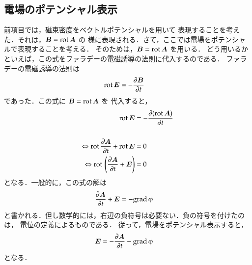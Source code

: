         \subsection{電場のポテンシャル表示}
            前項目では，磁束密度をベクトルポテンシャルを用いて
            表現することを考えた．それは，$\boldsymbol{B}=\mathrm{rot\,}\boldsymbol{A}$ の
            様に表現される．さて，ここでは電場をポテンシャルで表現することを考える．
            そのためは，$\boldsymbol{B}=\mathrm{rot\,}\boldsymbol{A}$ を用いる．
            どう用いるかといえば，この式をファラデーの電磁誘導の法則に代入するのである．
            ファラデーの電磁誘導の法則は
            \begin{align}
            \mathrm{rot}\, \boldsymbol{E} &= -\frac{\partial \boldsymbol{B}}{\partial t}
            \end{align}
            であった．この式に $\boldsymbol{B}=\mathrm{rot\,}\boldsymbol{A}$ を
            代入すると，
            \begin{align}
            \mathrm{rot\,} \boldsymbol{E} &= -\frac{\partial(\mathrm{rot\,}\boldsymbol{A})}{\partial t}\notag \\ \notag \\
            \Leftrightarrow
            \mathrm{rot\,}\frac{\partial\boldsymbol{A}}{\partial t}
            +\mathrm{rot\,} \boldsymbol{E}&=0 \notag \\
            \Leftrightarrow
            \mathrm{rot\,}\left(\frac{\partial\boldsymbol{A}}{\partial t}
            + \boldsymbol{E}\right) &=0
            \end{align}
            となる．一般的に，この式の解は
            \begin{align}
            \frac{\partial\boldsymbol{A}}{\partial t}
            + \boldsymbol{E}&=-\mathrm{grad\,}\phi
            \end{align}
            と書かれる．但し数学的には，右辺の負符号は必要ない．負の符号を付けたのは，
            電位の定義によるものである．
            従って，電場をポテンシャル表示すると，
            \begin{align}
            \boldsymbol{E}&=-\frac{\partial\boldsymbol{A}}{\partial t}-\mathrm{grad\,}\phi
            \end{align}
            となる．


